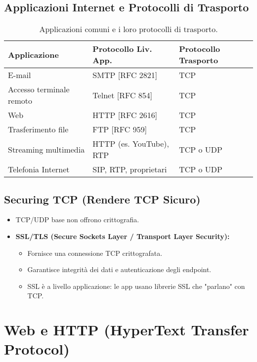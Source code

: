 \subsection{Applicazioni Internet e Protocolli di Trasporto}
\begin{table}[H]
\centering
\begin{tabular}{|l|l|l|}
\hline
\textbf{Applicazione}     & \textbf{Protocollo Liv. App.} & \textbf{Protocollo Trasporto} \\ \hline
E-mail                 & SMTP [RFC 2821]           & TCP                           \\
Accesso terminale remoto & Telnet [RFC 854]          & TCP                           \\
Web                    & HTTP [RFC 2616]           & TCP                           \\
Trasferimento file     & FTP [RFC 959]             & TCP                           \\
Streaming multimedia   & HTTP (es. YouTube), RTP   & TCP o UDP                     \\
Telefonia Internet     & SIP, RTP, proprietari     & TCP o UDP                     \\ \hline
\end{tabular}
\caption{Applicazioni comuni e i loro protocolli di trasporto.}
\end{table}

\subsection{Securing TCP (Rendere TCP Sicuro)}
\begin{itemize}
    \item TCP/UDP base non offrono crittografia.
    \item \textbf{SSL/TLS (Secure Sockets Layer / Transport Layer Security):}
    \begin{itemize}
        \item Fornisce una connessione TCP crittografata.
        \item Garantisce integrità dei dati e autenticazione degli endpoint.
        \item SSL è a livello applicazione: le app usano librerie SSL che "parlano" con TCP.
    \end{itemize}
\end{itemize}

\section{Web e HTTP (HyperText Transfer Protocol)}
